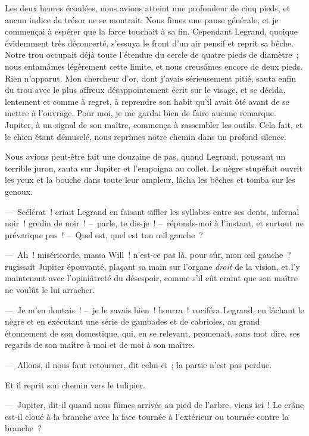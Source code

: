 \documentclass[french,twoside]{book} %
\begin{document}
Les deux heures écoulées, nous avions atteint une profondeur de cinq pieds, et aucun indice de trésor ne se montrait. Nous fîmes une pause générale, et je commençai à espérer que la farce touchait à sa fin. Cependant Legrand, quoique évidemment très déconcerté, s’essuya le front d’un air pensif et reprit sa bêche. Notre trou occupait déjà toute l’étendue du cercle de quatre pieds de diamètre ; nous entamâmes légèrement cette limite, et nous creusâmes encore de deux pieds. Rien n’apparut. Mon chercheur d’or, dont j’avais sérieusement pitié, sauta enfin du trou avec le plus affreux désappointement écrit sur le visage, et se décida, lentement et comme à regret, à reprendre son habit qu’il avait ôté avant de se mettre à l’ouvrage. Pour moi, je me gardai bien de faire aucune remarque. Jupiter, à un signal de son maître, commença à rassembler les outils. Cela fait, et le chien étant démuselé, nous reprîmes notre chemin dans un profond silence.\par
Nous avions peut-être fait une douzaine de pas, quand Legrand, poussant un terrible juron, sauta sur Jupiter et l’empoigna au collet. Le nègre stupéfait ouvrit les yeux et la bouche dans toute leur ampleur, lâcha les bêches et tomba sur les genoux.\par
— Scélérat ! criait Legrand en faisant siffler les syllabes entre ses dents, infernal noir ! gredin de noir ! – parle, te dis-je ! – réponds-moi à l’instant, et surtout ne prévarique pas ! – Quel est, quel est ton œil gauche ?\par
— Ah ! miséricorde, massa Will ! n’est-ce pas là, pour sûr, mon œil gauche ? rugissait Jupiter épouvanté, plaçant sa main sur l’organe \emph{droit} de la vision, et l’y maintenant avec l’opiniâtreté du désespoir, comme s’il eût craint que son maître ne voulût le lui arracher.\par
— Je m’en doutais ! – je le savais bien ! hourra ! vociféra Legrand, en lâchant le nègre et en exécutant une série de gambades et de cabrioles, au grand étonnement de son domestique, qui, en se relevant, promenait, sans mot dire, ses regards de son maître à moi et de moi à son maître.\par
— Allons, il nous faut retourner, dit celui-ci ; la partie n’est pas perdue.\par
Et il reprit son chemin vers le tulipier.\par
— Jupiter, dit-il quand nous fûmes arrivés au pied de l’arbre, viens ici ! Le crâne est-il cloué à la branche avec la face tournée à l’extérieur ou tournée contre la branche ?\par
\end{document}
